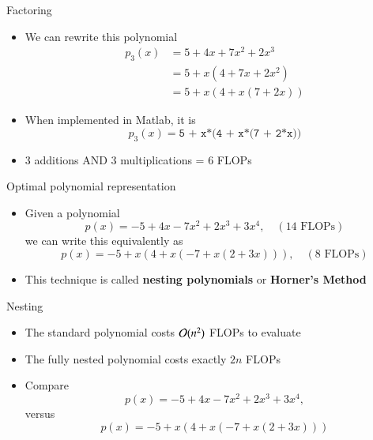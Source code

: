 \documentclass[10pt]{beamer}
\begin{document}
\begin{frame}{Factoring}
\begin{itemize}
    \item We can rewrite this polynomial 
    \begin{align*}
    p_3(x) &= 5 + 4x +7x^2 + 2x^3\\
           &= 5 + x(4 +7x + 2x^2)\\
           &= 5 + x(4 +x(7 + 2x))
    \end{align*}

    \item When implemented in Matlab, it is 
        $$p_3(x) = \texttt{5 + x*(4 + x*(7 + 2*x))}$$

    \item 3 additions AND 3 multiplications = 6 FLOPs\\[3mm]

\end{itemize}
\end{frame}

\begin{frame}{Optimal polynomial representation}
\begin{itemize}
    \item Given a polynomial
\begin{equation*}
  p(x) = -5 + 4x -7x^2 + 2x^3 + 3x^4,\quad (14 \text{ FLOPs})
\end{equation*}
we can write this equivalently as
\begin{equation*}
  p(x) = -5 + x(4 + x(-7 + x(2 + 3x))),\quad (8\text{ FLOPs})
\end{equation*}

\item This technique is called \textbf{nesting polynomials} or \textbf{Horner's Method}

\end{itemize}
\end{frame}
\begin{frame}{Nesting}

\begin{itemize}
    \item The standard polynomial costs ${\mathcal{O}}(n^2)$ FLOPs to evaluate 
    \item The fully nested polynomial costs exactly $2n$ FLOPs
    \item Compare $$ p(x) = -5 + 4x -7x^2 + 2x^3 + 3x^4,$$ versus $$ p(x) = -5 + x(4 + x(-7 + x(2 + 3x)))$$
\end{itemize}

\end{frame}
\end{document}
